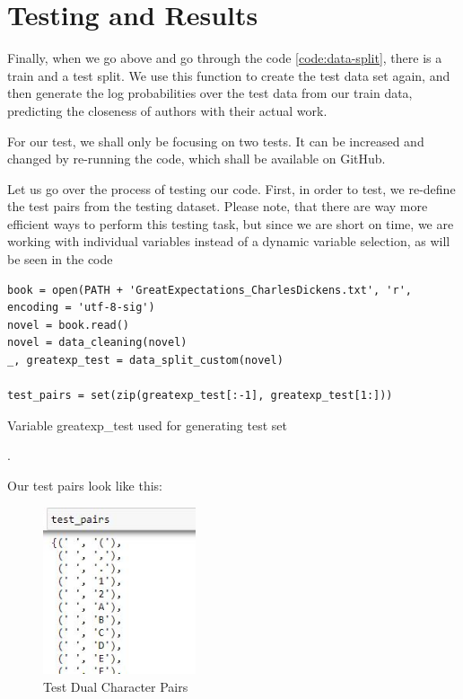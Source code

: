 \section{Testing and Results}
\label{sec:results}

Finally, when we go above and go through the code \ref{code:data-split}, there is a train and a test split. We use this function to create the test data set again, and then generate the log probabilities over the test data from our train data, predicting the closeness of authors with their actual work.

For our test, we shall only be focusing on two tests. It can be increased and changed by re-running the code, which shall be available on GitHub. 

Let us go over the process of testing our code. First, in order to test, we re-define the test pairs from the testing dataset. Please note, that there are way more efficient ways to perform this testing task, but since we are short on time, we are working with individual variables instead of a dynamic variable selection, as will be seen in the code 
\vspace{0.5cm}

\begin{code}
\label{code:testing-data-load}
\begin{verbatim}
book = open(PATH + 'GreatExpectations_CharlesDickens.txt', 'r', encoding = 'utf-8-sig')
novel = book.read()
novel = data_cleaning(novel)
_, greatexp_test = data_split_custom(novel)

test_pairs = set(zip(greatexp_test[:-1], greatexp_test[1:]))
\end{verbatim}
\caption{Variable greatexp_test used for generating test set}.
\end{code}

Our test pairs look like this:

\begin{figure}[H]
	\begin{center}
		\includegraphics[width = 0.4\textwidth]{Images/test_pairs.JPG} %
		\caption{Test Dual Character Pairs}
		\label{fig:test-char-pairs}
	\end{center}
\end{figure}
\vspace{0.5cm}

